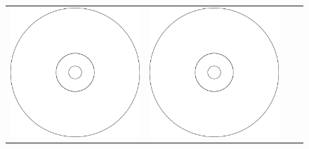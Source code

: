 \documentclass[preprint, 11pt]{article}
\begin{document}
\begin{figure}[!h]
{\begin{tabular}{cccc}
      \includegraphics[scale=0.24]{figures/chj_r2wp_rusanov_t4p0.png} &
      \includegraphics[scale=0.24]{figures/chj_r2wp_rusanov_t5p0.png}
    \end{tabular}
  }
  

\end{figure}
\end{document}
